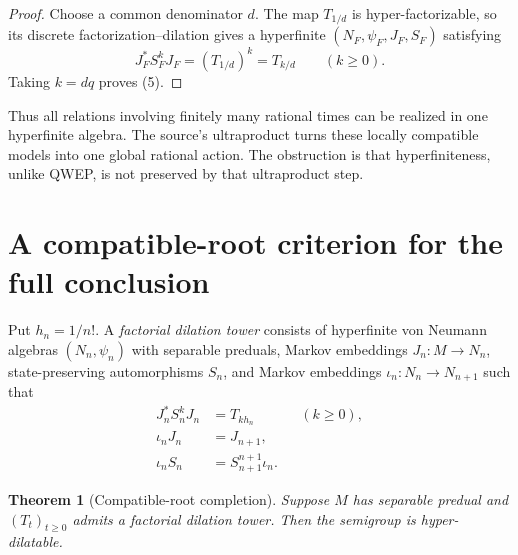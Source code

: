 \documentclass[11pt]{article}
\newtheorem{theorem}{Theorem}
\begin{document}
\begin{proof}
Choose a common denominator $d$.  The map $T_{1/d}$ is
hyper-factorizable, so its discrete factorization--dilation gives a
hyperfinite $(N_F,\psi_F,J_F,S_F)$ satisfying
\[
 J_F^*S_F^kJ_F=(T_{1/d})^k=T_{k/d}\qquad(k\geq0).
\]
Taking $k=dq$ proves (5).
\end{proof}

Thus all relations involving finitely many rational times can be realized in
one hyperfinite algebra.  The source's ultraproduct turns these locally
compatible models into one global rational action.  The obstruction is that
hyperfiniteness, unlike QWEP, is not preserved by that ultraproduct step.

\section{A compatible-root criterion for the full conclusion}

Put $h_n=1/n!$.  A \emph{factorial dilation tower} consists of hyperfinite
von Neumann algebras $(N_n,\psi_n)$ with separable preduals, Markov embeddings
$J_n:M\to N_n$, state-preserving automorphisms $S_n$, and Markov embeddings
$\iota_n:N_n\to N_{n+1}$ such that
\begin{align}
 J_n^*S_n^kJ_n&=T_{kh_n} &&(k\geq0),               \tag{6}\\
 \iota_nJ_n&=J_{n+1},                              \tag{7}\\
 \iota_nS_n&=S_{n+1}^{n+1}\iota_n.               \tag{8}
\end{align}

\begin{theorem}[Compatible-root completion]\label{thm:tower}
Suppose $M$ has separable predual and $(T_t)_{t\geq0}$ admits a factorial
dilation tower.  Then the semigroup is hyper-dilatable.
\end{theorem}
\end{document}
